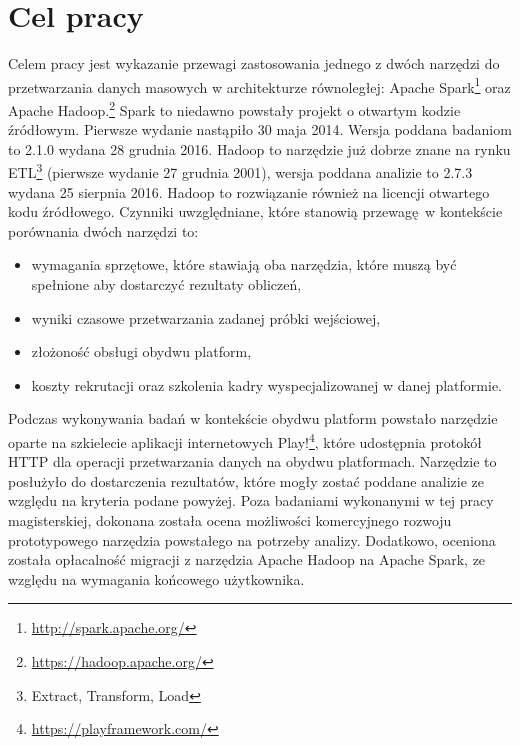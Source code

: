 \section{Cel pracy}\label{sec:thesis_objective}
Celem pracy jest wykazanie przewagi zastosowania jednego z dwóch narzędzi do przetwarzania danych masowych w architekturze równoległej: Apache Spark\footnote{\url{http://spark.apache.org/}} oraz Apache Hadoop.\footnote{\url{https://hadoop.apache.org/}} Spark to niedawno powstały projekt o otwartym kodzie źródłowym. Pierwsze wydanie nastąpiło 30 maja 2014. Wersja poddana badaniom to 2.1.0 wydana 28 grudnia 2016. Hadoop to narzędzie już dobrze znane na rynku ETL\footnote{Extract, Transform, Load} (pierwsze wydanie 27 grudnia 2001), wersja poddana analizie to 2.7.3 wydana 25 sierpnia 2016. Hadoop to rozwiązanie również na licencji otwartego kodu źródłowego. Czynniki uwzględniane, które stanowią przewagę w kontekście porównania dwóch narzędzi to:
\begin{itemize}
	\item wymagania sprzętowe, które stawiają oba narzędzia, które muszą być spełnione aby dostarczyć rezultaty obliczeń,
	\item wyniki czasowe przetwarzania zadanej próbki wejściowej,
	\item złożoność obsługi obydwu platform,
	\item koszty rekrutacji oraz szkolenia kadry wyspecjalizowanej w danej platformie.
\end{itemize}
Podczas wykonywania badań w kontekście obydwu platform powstało narzędzie oparte na szkielecie aplikacji internetowych Play!\footnote{\url{https://playframework.com/}}, które udostępnia protokół HTTP dla operacji przetwarzania danych na obydwu platformach. Narzędzie to posłużyło do dostarczenia rezultatów, które mogły zostać poddane analizie ze względu na kryteria podane powyżej. Poza badaniami wykonanymi w tej pracy magisterskiej, dokonana została ocena możliwości komercyjnego rozwoju prototypowego narzędzia powstałego na potrzeby analizy. Dodatkowo, oceniona została opłacalność migracji z narzędzia Apache Hadoop na Apache Spark, ze względu na wymagania końcowego użytkownika.
